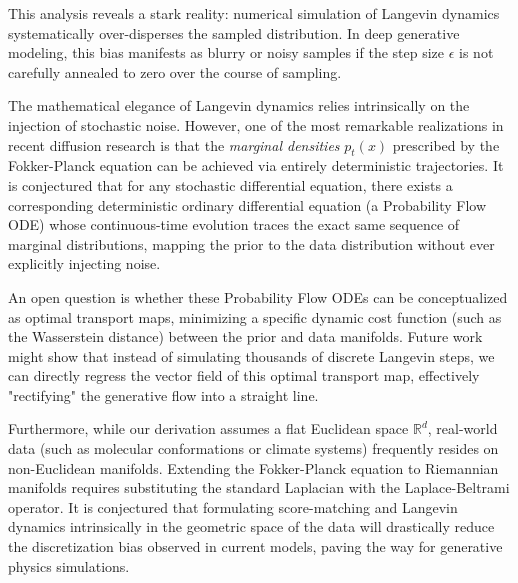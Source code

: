 This analysis reveals a stark reality: numerical simulation of Langevin dynamics systematically over-disperses the sampled distribution. In deep generative modeling, this bias manifests as blurry or noisy samples if the step size $\epsilon$ is not carefully annealed to zero over the course of sampling.

\begin{horizon}
The mathematical elegance of Langevin dynamics relies intrinsically on the injection of stochastic noise. However, one of the most remarkable realizations in recent diffusion research is that the \emph{marginal densities} $p_t(x)$ prescribed by the Fokker-Planck equation can be achieved via entirely deterministic trajectories. It is conjectured that for any stochastic differential equation, there exists a corresponding deterministic ordinary differential equation (a Probability Flow ODE) whose continuous-time evolution traces the exact same sequence of marginal distributions, mapping the prior to the data distribution without ever explicitly injecting noise. 

An open question is whether these Probability Flow ODEs can be conceptualized as optimal transport maps, minimizing a specific dynamic cost function (such as the Wasserstein distance) between the prior and data manifolds. Future work might show that instead of simulating thousands of discrete Langevin steps, we can directly regress the vector field of this optimal transport map, effectively "rectifying" the generative flow into a straight line. 

Furthermore, while our derivation assumes a flat Euclidean space $\mathbb{R}^d$, real-world data (such as molecular conformations or climate systems) frequently resides on non-Euclidean manifolds. Extending the Fokker-Planck equation to Riemannian manifolds requires substituting the standard Laplacian with the Laplace-Beltrami operator. It is conjectured that formulating score-matching and Langevin dynamics intrinsically in the geometric space of the data will drastically reduce the discretization bias observed in current models, paving the way for generative physics simulations.
\end{horizon}

